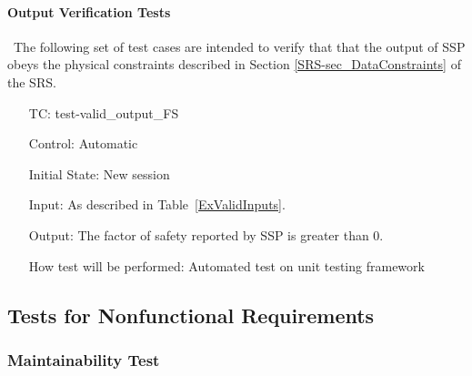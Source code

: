 \documentclass[12pt, titlepage]{article}
\newcounter{testnum} %
\newcommand{\progname}{SSP}
\begin{document}
\paragraph{Output Verification Tests}

~\newline \noindent The following set of test cases are intended to 
verify that that the output of \progname{} obeys the physical constraints 
described in Section \ref{SRS-sec_DataConstraints} of the SRS.

\begin{enumerate}[label=TC\arabic*:,ref={\arabic*}]
	
\item [TC\refstepcounter{testnum}\thetestnum: \label{TC_ValidOutFS}] 
test-valid\_output\_FS

Control: Automatic

Initial State: New session

Input: As described in Table~\ref{ExValidInputs}.

Output: The factor of safety reported by \progname{} is greater than 0.

How test will be performed: Automated test on unit testing framework
	
\end{enumerate}

\subsection{Tests for Nonfunctional Requirements} \label{sec_NFRTests}

\subsubsection{Maintainability Test} \label{sec_Maintainability}
\end{document}
